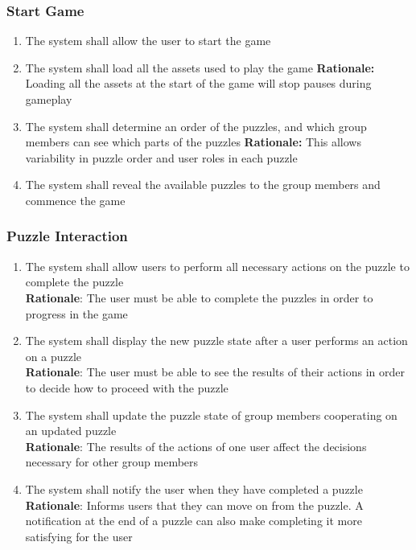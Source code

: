 \documentclass[12pt]{article}
\begin{document}
\subsubsection{Start Game}
\begin{enumerate}[label=ST\arabic*., series=StartGame]
	\item The system shall allow the user to start the game
    \item The system shall load all the assets used to play the game\newline 
    \textbf{Rationale:} Loading all the assets at the start of the game will stop pauses during gameplay
    \item The system shall determine an order of the puzzles, and which group members can see which parts of the puzzles\newline 
    \textbf{Rationale:} This allows variability in puzzle order and user roles in each puzzle
    \item The system shall reveal the available puzzles to the group members and commence the game 
\end{enumerate}

\subsubsection{Puzzle Interaction}
    \begin{enumerate}[label=PI\arabic*., series=PuzzleInteract]
        \item The system shall allow users to perform all necessary actions on the puzzle to complete the puzzle\\
        \textbf{Rationale}: The user must be able to complete the puzzles in order to progress in the game
        \item The system shall display the new puzzle state after a user performs an action on a puzzle\\
        \textbf{Rationale}: The user must be able to see the results of their actions in order to decide how to proceed with the puzzle
        \item The system shall update the puzzle state of group members cooperating on an updated puzzle\\
        \textbf{Rationale}: The results of the actions of one user affect the decisions necessary for other group members
        \item The system shall notify the user when they have completed a puzzle\\
        \textbf{Rationale}: Informs users that they can move on from the puzzle. A notification at the end of a puzzle can also make completing it more satisfying for the user
    \end{enumerate}
\end{document}

